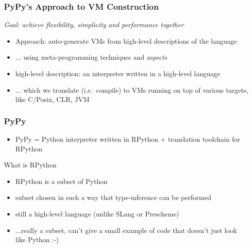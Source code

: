 \documentclass[utf8x]{beamer}
\begin{document}
\begin{frame}
  \frametitle{PyPy's Approach to VM Construction}
  \emph{Goal: achieve flexibility, simplicity and performance together}

  \begin{itemize}
  \item
    Approach: auto-generate VMs from high-level descriptions of the language
  \item
    ... using meta-programming techniques and \emph{aspects}
  \item
    high-level description: an interpreter written in a high-level language
  \item
    ... which we translate (i.e.\ compile) to VMs running on top of various
    targets, like C/Posix, CLR, JVM
  \end{itemize}
\end{frame}

\begin{frame}
  \frametitle{PyPy}
  \begin{itemize}
  \item
    PyPy = Python interpreter written in RPython + translation toolchain
    for RPython
  \end{itemize}
  \pause
  \begin{block}{
    What is RPython}
    \begin{itemize}
    \item
      RPython is a subset of Python
    \item
      subset chosen in such a way that type-inference can be performed
    \item
      still a high-level language (unlike SLang or Prescheme)
    \item
      ...really a subset, can't give a small example of code that
      doesn't just look like Python :-)
    \end{itemize}
  \end{block}
\end{frame}
\end{document}
